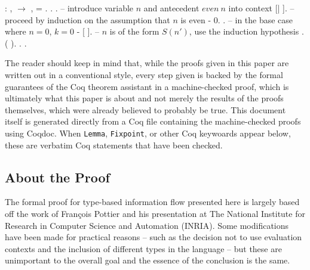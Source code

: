 \documentclass[12pt]{report}
\begin{document}
\begin{coqdoccode}
\coqdocemptyline
\coqdocnoindent
{}  : \coqdockw{\ensuremath{\forall}} ,\coqdoceol
\coqdocindent{1.00em}
  \ensuremath{\rightarrow} \coqdoctac{\ensuremath{\exists}} ,  =  .\coqdoceol
\coqdocnoindent
{}.\coqdoceol
\coqdocindent{1.00em}
  . -- introduce
    variable $n$ and antecedent $even\ n$ into context \coqdoceol
\coqdocindent{1.00em}
   [|
     ]. -- proceed by induction on the
    assumption that $n$ is even \coqdoceol
\coqdocindent{1.00em}
- \coqdocindent{2.00em}
\coqdoctac{\ensuremath{\exists}} 0. . -- in the
    base case where $n=0$, $k=0$ \coqdoceol
\coqdocindent{1.00em}
- \coqdocindent{2.00em}
   [
    ]. -- $n$ is of the form $S(n')$, use the
    induction hypothesis \coqdoceol
\coqdocindent{2.00em}
 . \coqdoctac{\ensuremath{\exists}} ( ). .\coqdoceol
\coqdocnoindent
{}.\coqdoceol
\coqdocemptyline
\end{coqdoccode}



The reader should keep in mind that, while the proofs given in this
paper are written out in a conventional style, every step given is
backed by the formal guarantees of the Coq theorem assistant in
a machine-checked proof, which is ultimately what this paper is about
and not merely the results of the proofs themselves, which were
already believed to probably be true. This document itself is
generated directly from a Coq file containing the machine-checked
proofs using Coqdoc. When \texttt{Lemma}, \texttt{Fixpoint}, or other
Coq keywoards appear below, these are verbatim Coq statements that
have been checked.

\subsection{About the Proof}



The formal proof for type-based information flow presented here is
largely based off the work of François Pottier and his presentation
at The National Institute for Research in Computer Science and
Automation (INRIA). 
Some modifications have been made for practical reasons – such as the
decision not to use evaluation contexts and the inclusion of
different types in the language – but these are unimportant to the
overall goal and the essence of the conclusion is the same. 
\end{document}
